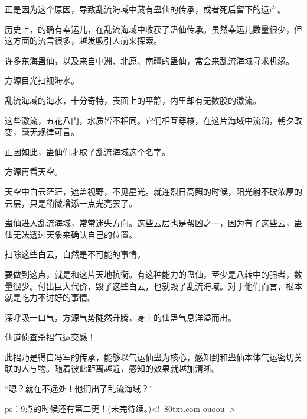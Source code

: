 \begin{this_body}
正是因为这个原因，导致乱流海域中藏有蛊仙的传承，或者死后留下的遗产。

历史上，的确有幸运儿，在乱流海域中收获了蛊仙传承。虽然幸运儿数量很少，但这方面的流言很多，越发吸引人前来探索。

许多东海蛊仙，以及来自中洲、北原、南疆的蛊仙，常会来乱流海域寻求机缘。

方源目光扫视海水。

乱流海域的海水，十分奇特，表面上的平静，内里却有无数股的激流。

这些激流，五花八门，水质皆不相同。它们相互穿梭，在这片海域中流淌，朝夕改变，毫无规律可言。

正因如此，蛊仙们才取了乱流海域这个名字。

方源再看天空。

天空中白云茫茫，遮盖视野，不见星光。就连烈日高照的时候，阳光射不破浓厚的云层，只是稍微增添一点光亮罢了。

蛊仙进入乱流海域，常常迷失方向。这些云层也是帮凶之一，因为有了这些云，蛊仙无法透过天象来确认自己的位置。

扫除这些白云，自然是不可能的事情。

要做到这点，就是和这片天地抗衡。有这种能力的蛊仙，至少是八转中的强者，数量很少。付出巨大代价，毁了这些白云，也就毁了乱流海域。对于他们而言，根本就是吃力不讨好的事情。

深呼吸一口气，方源气势陡然升腾，身上的仙蛊气息洋溢而出。

仙道侦查杀招气运交感！

此招乃是得自冯军的传承，能够以气运仙蛊为核心，感知到和蛊仙本体气运密切关联的人与物。随着彼此距离越近，感知的效果就越加清晰。

“嗯？就在不远处！他们出了乱流海域？”

ps：9点的时候还有第二更！(未完待续。)<!--80txt.com-ouoou-->

\end{this_body}


